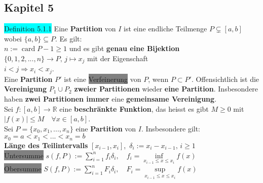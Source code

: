 \documentclass[10pt]{article}
\begin{document}
\subsection*{Kapitel 5}
\colorbox{cyan}{Definition 5.1.1} Eine \textbf{Partition} von \textcolor{NavyBlue}{$I$} 
                ist eine endliche Teilmenge \textcolor{NavyBlue}{$P\subsetneq[a,b]$} 
                wobei \textcolor{NavyBlue}{$\{a,b\}\subseteq P$}. 
                Es gilt: \\
        \indent \textcolor{NavyBlue}{$n:=\operatorname{card} P-1\geqslant1$} und es gibt 
                \textbf{genau eine Bijektion} 
                \textcolor{NavyBlue}{$\{0,1,2,...,n\}\longrightarrow P,\,j\mapsto x_j$}
                mit der Eigenschaft \\
        \indent \textcolor{NavyBlue}{$i<j\Longrightarrow x_i<x_j$}.\\
Eine \textbf{Partition} \textcolor{NavyBlue}{$P'$ }ist eine 
                \colorbox{gray}{Verfeinerung} von \textcolor{NavyBlue}{$P$}, 
                wenn \textcolor{NavyBlue}{$P\subset P'$}. 
                Offensichtlich ist die \textbf{Vereinigung} 
                \textcolor{NavyBlue}{$P_1\cup P_2$} \textbf{zweier Partitionen} 
                wieder \textbf{eine Partition}. Insbesondere 
                haben \textbf{zwei Partitionen immer} 
                eine \textbf{gemeinsame Vereinigung}.\\
Sei \textcolor{NavyBlue}{$f:[a,b]\longrightarrow\mathbb{R}$} eine \textbf{beschränkte Funktion}, 
                das heisst es gibt 
                \textcolor{NavyBlue}{$M\geqslant0$} mit 
                \textcolor{NavyBlue}{$|f(x)|\leqslant M\quad\forall x\in[a,b]$}. \\
Sei \textcolor{NavyBlue}{$P=\{x_0,x_1,...,x_n\}$} eine \textbf{Partition} von 
                \textcolor{NavyBlue}{$I$}. Insbesondere gilt: 
                \textcolor{NavyBlue}{$x_0=a<x_1<...<x_n=b$}\\
\textbf{Länge des Teilintervalls} 
                \textcolor{NavyBlue}{$[x_{i-1},x_i]$},\,
                \textcolor{NavyBlue}{$\delta_i:=x_i-x_{i-1},\,i\geqslant1$}\\
\colorbox{gray}{Untersumme} 
                \textcolor{NavyBlue}{$s(f,P):=\sum_{i=1}^nf_i\delta_i,\quad 
                f_i=\inf\limits_{x_{i-1}\leqslant x\leqslant x_i}f(x)$} \\
\colorbox{gray}{Obersumme} 
                \textcolor{NavyBlue}{$S(f,P):=\sum_{i=1}^nF_i\delta_i,\quad 
                F_i=\sup\limits_{x_{i-1}\leqslant x\leqslant x_i}f(x)$}\\
\end{document}
